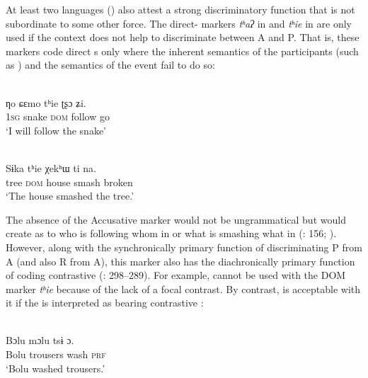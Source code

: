 \documentclass[output=paper]{langsci/langscibook}
\begin{document}
At least two  languages () also attest a strong discriminatory function that is not subordinate to some other force. The direct- markers \textit{tʰ}\textit{aʔ} in  and \textit{tʰ}\textit{ie} in  are only used if the context does not help to discriminate between A and P. That is, these markers code direct s only where the inherent semantics of the participants (such as ) and the semantics of the event fail to do so:

\ea\label{ex:serzant:25}
\\
\gll ƞo   ɕεmo   tʰie   ʈʂɔ   ʑi.\\
     1\textsc{sg}  snake  \textsc{dom}  follow  go\\
\glt ‘I will follow the snake’
\z

\ea\label{ex:serzant:26}
\\
\gll Sɨka   tʰie   χekʰɯ   ti   na.\\
     tree  \textsc{dom}  house  smash  broken\\
\glt ‘The house smashed the tree.’
\z

\noindent The absence of the Accusative marker would not be ungrammatical but would create  as to who is following whom in  or what is smashing what in  (\citealt{Matisoff1973}: 156; \citealt{Gerner2008}). However, along with the synchronically primary function of discriminating P from A (and also R from A), this marker also has the diachronically primary function of coding contrastive  (\citealt{Gerner2008}: 298–289). For example,  cannot be used with the DOM marker \textit{tʰ}\textit{ie} because of the lack of a focal contrast. By contrast,  is acceptable with it if the  is interpreted as bearing contrastive  \citep[299]{Gerner2008}:

\ea\label{ex:serzant:27}
\\
\ea\label{ex:serzant:27a}
\gll Bɔlu   mɔlu     tsɨ   ɔ.\\
     Bolu  trousers  wash  \textsc{prf}\\
\glt ‘Bolu washed trousers.’
\end{document}
